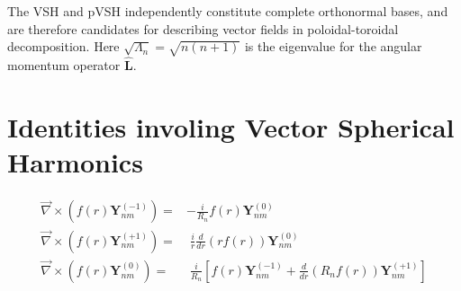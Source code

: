 \documentclass[times]{aastex631}
\newcommand{\curl}{\vec{\nabla}\times}
\newcommand{\nin}{\noindent}
\newcommand{\ypvsh}[2]{\mathbf{Y}_{#1}^{(#2)}}
\begin{document}
\nin The VSH and pVSH independently constitute complete orthonormal bases, and are therefore candidates for describing vector fields in poloidal-toroidal decomposition. Here $\sqrt{\Lambda_n}=\sqrt{n(n+1)}$ is the eigenvalue for the angular momentum operator $\widehat{\textbf{L}}$.

\section{Identities involing Vector Spherical Harmonics}

\begin{align}
\curl\left(f(r)\ypvsh{nm}{-1}\right) = & -\frac{i}{R_n}f(r)\ypvsh{nm}{0} \\
\curl\left(f(r)\ypvsh{nm}{+1}\right) = & \;\frac{i}{r}\frac{d}{dr}\left(rf(r)\right)\ypvsh{nm}{0} \\
\curl\left(f(r)\ypvsh{nm}{0}\right) = & \;\frac{i}{R_n}\left[f(r)\ypvsh{nm}{-1}+\frac{d}{dr}\left(R_nf(r)\right)\ypvsh{nm}{+1}\right]
\end{align}
\end{document}
